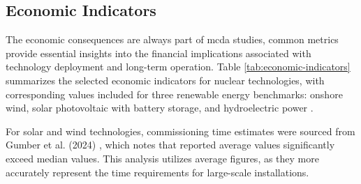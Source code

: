 \subsection{Economic Indicators}
\label{sec:economic_indicators}
The economic consequences are always part of \gls{mcda} studies, common metrics provide essential insights into the financial implications associated with technology deployment and long-term operation. Table \ref{tab:economic-indicators} summarizes the selected economic indicators for nuclear technologies, with corresponding values included for three renewable energy benchmarks: onshore wind, solar photovoltaic with battery storage, and hydroelectric power \cite{EIA_Capital_Costs_AEO2024}.

For solar and wind technologies, commissioning time estimates were sourced from Gumber et al. (2024) \cite{GUMBER2024122563}, which notes that reported average values significantly exceed median values. This analysis utilizes average figures, as they more accurately represent the time requirements for large-scale installations.

